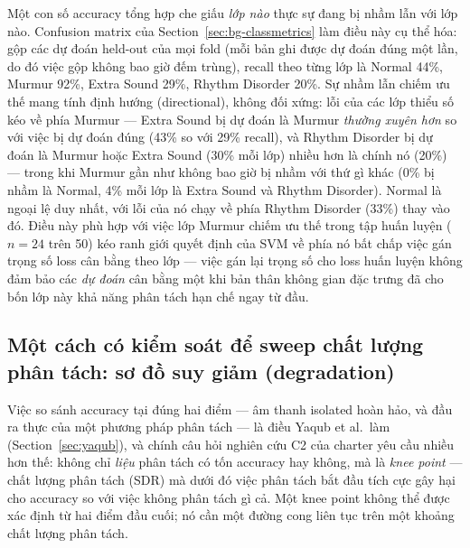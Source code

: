 \documentclass[11pt]{article}
\begin{document}
Một con số accuracy tổng hợp che giấu \emph{lớp nào} thực sự đang bị nhầm
lẫn với lớp nào. Confusion matrix của Section~\ref{sec:bg-classmetrics}
làm điều này cụ thể hóa: gộp các dự đoán held-out của mọi fold (mỗi bản
ghi được dự đoán đúng một lần, do đó việc gộp không bao giờ đếm trùng),
recall theo từng lớp là Normal 44\%, Murmur 92\%, Extra Sound 29\%,
Rhythm Disorder 20\%. Sự nhầm lẫn chiếm ưu thế mang tính định hướng
(directional), không đối xứng: lỗi của các lớp thiểu số kéo về phía
Murmur --- Extra Sound bị dự đoán là Murmur \emph{thường xuyên hơn} so
với việc bị dự đoán đúng (43\% so với 29\% recall), và Rhythm Disorder
bị dự đoán là Murmur hoặc Extra Sound (30\% mỗi lớp) nhiều hơn là chính
nó (20\%) --- trong khi Murmur gần như không bao giờ bị nhầm với thứ gì
khác (0\% bị nhầm là Normal, 4\% mỗi lớp là Extra Sound và Rhythm
Disorder). Normal là ngoại lệ duy nhất, với lỗi của nó chạy về phía
Rhythm Disorder (33\%) thay vào đó. Điều này phù hợp với
việc lớp Murmur chiếm ưu thế trong tập huấn luyện ($n{=}24$ trên 50) kéo
ranh giới quyết định của SVM về phía nó bất chấp việc gán trọng số loss
cân bằng theo lớp --- việc gán lại trọng số cho loss huấn luyện không
đảm bảo các \emph{dự đoán} cân bằng một khi bản thân không gian đặc
trưng đã cho bốn lớp này khả năng phân tách hạn chế ngay từ đầu.

\subsection{Một cách có kiểm soát để sweep chất lượng phân tách: sơ đồ suy giảm (degradation)}
\label{sec:degradation}

Việc so sánh accuracy tại đúng hai điểm --- âm thanh isolated hoàn hảo, và
đầu ra thực của một phương pháp phân tách --- là điều Yaqub et al.\ làm
(Section~\ref{sec:yaqub}), và chính câu hỏi nghiên cứu C2 của charter yêu
cầu nhiều hơn thế: không chỉ \emph{liệu} phân tách có tốn accuracy hay
không, mà là \emph{knee point} --- chất lượng phân tách (SDR) mà dưới đó
việc phân tách bắt đầu tích cực gây hại cho accuracy so với việc không
phân tách gì cả. Một knee point không thể được xác định từ hai điểm đầu
cuối; nó cần một đường cong liên tục trên một khoảng chất lượng phân
tách.
\end{document}

